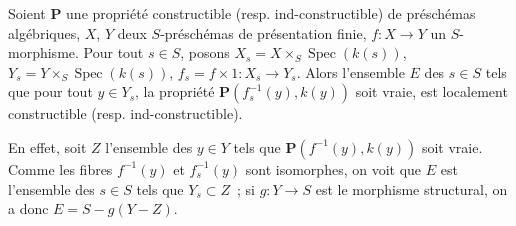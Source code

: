 \begin{corollary}[9.2.4]
\label{IV.9.2.4-fr}
Soient $\mathbf P$ une propriété constructible (resp. ind-constructible) de
préschémas algébriques, $X$, $Y$ deux $S$-préschémas de présentation finie,
$f:X\to Y$ un $S$-morphisme. Pour tout $s\in S$, posons
$X_s=X\times_S\operatorname{Spec}(k(s))$,
$Y_s=Y\times_S\operatorname{Spec}(k(s))$,
$f_s=f\times1:X_s\to Y_s$. Alors l'ensemble $E$ des $s\in S$ tels que pour
tout $y\in Y_s$, la propriété $\mathbf P(f_s^{-1}(y),k(y))$ soit vraie, est
localement constructible (resp. ind-constructible).
\end{corollary}

En effet, soit $Z$ l'ensemble des $y\in Y$ tels que
$\mathbf P(f^{-1}(y),k(y))$ soit vraie. Comme les fibres $f^{-1}(y)$ et
$f_s^{-1}(y)$ sont isomorphes, on voit que $E$ est l'ensemble des $s\in S$
tels que $Y_s\subset Z$~; si $g:Y\to S$ est le morphisme structural, on a
donc $E=S-g(Y-Z)$.

